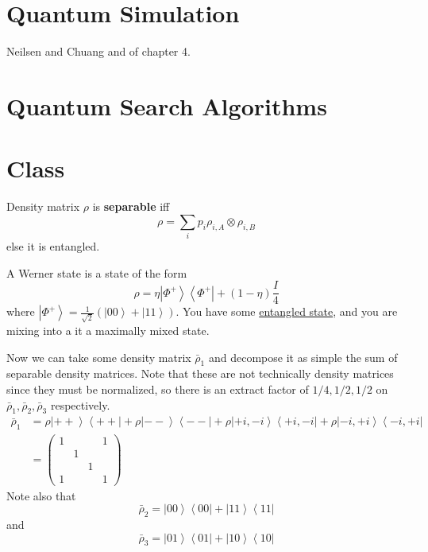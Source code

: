 \documentclass{article}
\newcommand{\ket}[1]{\ensuremath{\left|#1\right\rangle}}
\newcommand{\bra}[1]{\ensuremath{\left\langle#1\right|}}
\newcounter{definition}[section]
\begin{document}
\section{Quantum Simulation}

  Neilsen and Chuang and of chapter 4. 

\section{Quantum Search Algorithms}


\section{Class} 
  
  \begin{definition}[Separable]
    \label{def:separable-2}
    Density matrix $\rho$ is \textbf{separable} iff
    \begin{equation}
      \rho = \sum_i p_i \rho_{i, A} \otimes \rho_{i, B}
    \end{equation}
    else it is entangled. 
  \end{definition}

  \begin{definition}
    \label{def:werner-state}
    A Werner state is a state of the form 
    \begin{equation}
      \rho = \eta \ket{\Phi^+}\bra{\Phi^+} + (1-\eta) \frac{I}{4}
    \end{equation}
    where $\ket{\Phi^+} = \frac{1}{\sqrt{2}} (\ket{00} + \ket{11})$. You have some \hyperref[def:entangled-state]{entangled state}, and you are mixing into a it a maximally mixed state. 
  \end{definition}

  Now we can take some density matrix $\bar{\rho}_1$ and decompose it as simple the sum of separable density matrices. Note that these are not technically density matrices since they must be normalized, so there is an extract factor of $1/4, 1/2, 1/2$ on $\bar{\rho}_1, \bar{\rho}_2, \bar{\rho}_3$ respectively. 
  \begin{align}
    \bar{\rho}_1 & = \rho \ket{++} \bra{++} + \rho \ket{- -} \bra{--} + \rho \ket{+i, -i} \bra{+i, -i} + \rho \ket{-i, +i} \bra{-i, +i} \\
                 & = \begin{pmatrix} 1 & & & 1 \\ & 1 & & \\ & & 1 & \\ 1 & & & 1 \end{pmatrix} 
  \end{align}
  Note also that 
  \begin{equation}
    \bar{\rho}_2 = \ket{00} \bra{00} + \ket{11} \bra{11} 
  \end{equation}
  and 
  \begin{equation}
    \bar{\rho}_3 = \ket{01}\bra{01} + \ket{10}\bra{10} 
  \end{equation}
\end{document}
